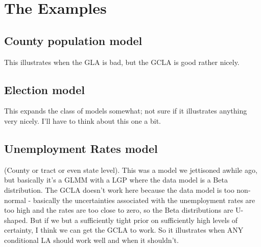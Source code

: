\documentclass[12pt]{article}
\begin{document}
\section{The Examples}
\subsection{County population model}
This illustrates when the GLA is bad, but the GCLA is good rather nicely.
\subsection{Election model}
This expands the class of models somewhat; not sure if it illustrates anything very nicely. I'll have to think about this one a bit.
\subsection{Unemployment Rates model}
(County or tract or even state level). This was a model we jettisoned awhile ago, but basically it's a GLMM with a LGP where the data model is a Beta distribution. The GCLA doesn't work here because the data model is too non-normal - basically the uncertainties associated with the unemployment rates are too high and the rates are too close to zero, so the Beta distributions are U-shaped. But if we but a sufficiently tight prior on sufficiently high levels of certainty, I think we can get the GCLA to work. So it illustrates when  ANY conditional LA should work well and when it shouldn't.

\clearpage\pagebreak\newpage\thispagestyle{empty}


\end{document}
